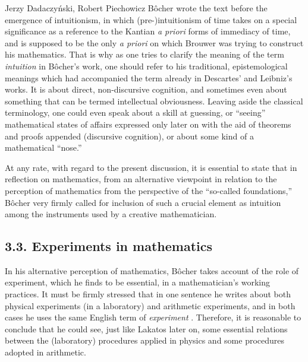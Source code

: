 \begin{artengenv}{Jerzy Dadaczyński, Robert Piechowicz}
Bôcher wrote the text before the emergence of intuitionism, in which (pre-)intuitionism of time takes on a special significance as a reference to the Kantian \textit{a priori} forms of immediacy of time, and is supposed to be the only \textit{a priori} on which Brouwer was trying to construct his mathematics. That is why as one tries to clarify the meaning of the term \textit{intuition} in Bôcher's work, one should refer to his traditional, epistemological meanings which had accompanied the term already in Descartes' and Leibniz's works. It is about direct, non-discursive cognition, and sometimes even about something that can be termed intellectual obviousness. Leaving aside the classical terminology, one could even speak about a skill at guessing, or ``seeing'' mathematical states of affairs expressed only later on with the aid of theorems and proofs appended (discursive cognition), or about some kind of a mathematical ``nose.''

At any rate, with regard to the present discussion, it is essential to state that in reflection on mathematics, from an alternative viewpoint in relation to the perception of mathematics from the perspective of the ``so-called foundations,'' Bôcher very firmly called for inclusion of such a crucial element as intuition among the instruments used by a creative mathematician.

\subsection{3.3. Experiments in mathematics}

In his alternative perception of mathematics, Bôcher takes account of the role of experiment, which he finds to be essential, in a mathematician's working practices. It must be firmly stressed that in one sentence he writes about both physical experiments (in a laboratory) and arithmetic experiments, and in both cases he uses the same English term of \textit{experiment}
\parencite[][p.134]{bocher_fundamental_1904}.
 Therefore, it is reasonable to conclude that he could see, just like Lakatos later on, some essential relations between the (laboratory) procedures applied in physics and some procedures adopted in arithmetic.


\end{artengenv}
